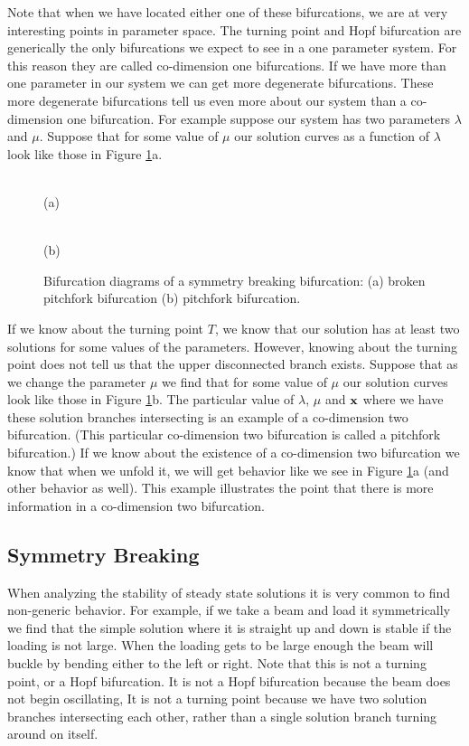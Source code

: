 Note that when  we have located either one of these 
bifurcations, we are at very interesting points in
parameter space.  
The turning point and Hopf bifurcation are generically the 
only bifurcations we expect to see in a one parameter system.
For this reason they are called co-dimension one bifurcations.
If we have more than one parameter in our system we can get 
more degenerate bifurcations.  These more degenerate bifurcations
tell us even more about our system than a co-dimension 
one bifurcation.  For example suppose our system has two
 parameters 
$\lambda$ and $\mu$. Suppose that for some value of $\mu$ 
our solution curves as a function of $\lambda $ look like those
in Figure \ref{fig:pitchfork}a.
\begin{figure}[tb]
 \begin{minipage}{0.5\linewidth}  
  \centering{} \\
  (a)
 \end{minipage} \hfill
 \begin{minipage}{0.5\linewidth}
  \centering{} \\
  (b)
 \end{minipage}
 \caption{Bifurcation diagrams of a symmetry breaking bifurcation: (a) broken pitchfork bifurcation (b) pitchfork bifurcation.}
 \label{fig:pitchfork}
\end{figure}  If we know about the  turning point
$T$, we know that our solution has at least two 
solutions for some values of the parameters.  However, knowing 
about the turning point does not tell us that the 
upper disconnected branch exists.  Suppose that as we change the
parameter $\mu$ we find that for some value of 
$\mu$  our solution curves look like those in Figure \ref{fig:pitchfork}b.  The
particular value of $\lambda$, $\mu$ and ${\bf x}$ where we
have these solution branches intersecting is an example of a 
co-dimension two bifurcation. (This particular co-dimension 
two bifurcation is called a pitchfork bifurcation.) If we know about the
existence of a co-dimension two bifurcation we know that
when we unfold it, we will get behavior like we see in 
Figure \ref{fig:pitchfork}a (and other behavior as well).  This example
illustrates the point that
there is more information in a co-dimension two bifurcation.

\subsection{Symmetry Breaking}
When analyzing the stability of steady state solutions it is 
very common to find non-generic behavior.  For example,
if we take a beam and load it symmetrically we find that
 the simple solution where it is straight up and down is stable 
if the loading is not large.  When the loading gets to be
large enough the beam will buckle by bending either to 
the left or right.  Note that this is not a turning point, or a 
Hopf bifurcation.  It is not a Hopf bifurcation because the
beam does not begin oscillating, It is not a turning point because
we have two solution branches intersecting each other, rather than
a single solution branch turning around on itself.  

